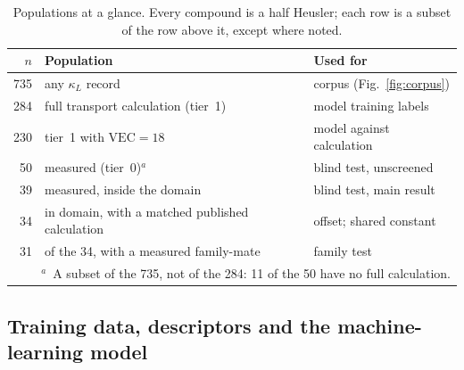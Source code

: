 \begin{table}[tbp]
  \centering
  \caption{Populations at a glance. Every compound is a half Heusler; each row is a subset of the
  row above it, except where noted.}
  \label{tab:populations}
  \footnotesize
  \setlength{\tabcolsep}{3pt}
  \begin{tabular}{r>{\raggedright\arraybackslash}p{}>{\raggedright\arraybackslash}p{}}
    \toprule
    $n$ & Population & Used for \\
    \midrule
    \num{735} & any $\kappa_L$ record & corpus (Fig.~\ref{fig:corpus}) \\
    \num{284} & full transport calculation (tier~1) & model training labels \\
    \num{230} & tier~1 with $\mathrm{VEC}=18$ & model against calculation \\
    \num{50}  & measured (tier~0)$^{a}$ & blind test, unscreened \\
    \num{39}  & measured, inside the domain & blind test, main result \\
    \num{34}  & in domain, with a matched published calculation & offset; shared constant \\
    \num{31}  & of the \num{34}, with a measured family-mate & family test \\
    \bottomrule
    \multicolumn{3}{p{0.92\columnwidth}}{\footnotesize $^{a}$~A subset of the \num{735}, not of the
    \num{284}: \num{11} of the \num{50} have no full calculation.} \\
  \end{tabular}
\end{table}

\subsection{Training data, descriptors and the machine-learning model}
\label{sec:trainingdata}
\label{sec:model}

